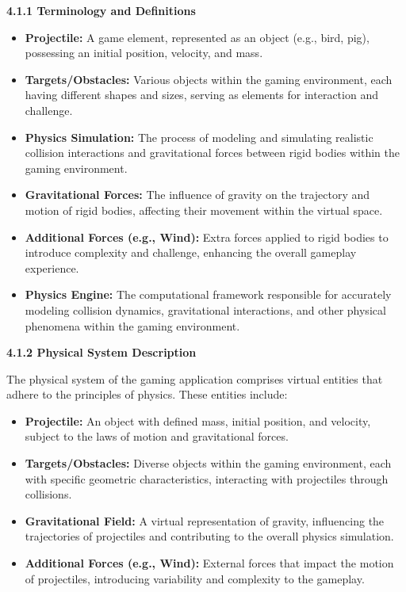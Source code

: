 \documentclass[
]{article}
\begin{document}
\textbf{4.1.1 Terminology and Definitions}

\begin{itemize}
\item
  \textbf{Projectile:} A game element, represented as an object (e.g.,
  bird, pig), possessing an initial position, velocity, and mass.
\item
  \textbf{Targets/Obstacles:} Various objects within the gaming
  environment, each having different shapes and sizes, serving as
  elements for interaction and challenge.
\item
  \textbf{Physics Simulation:} The process of modeling and simulating
  realistic collision interactions and gravitational forces between
  rigid bodies within the gaming environment.
\item
  \textbf{Gravitational Forces:} The influence of gravity on the
  trajectory and motion of rigid bodies, affecting their movement within
  the virtual space.
\item
  \textbf{Additional Forces (e.g., Wind):} Extra forces applied to rigid
  bodies to introduce complexity and challenge, enhancing the overall
  gameplay experience.
\item
  \textbf{Physics Engine:} The computational framework responsible for
  accurately modeling collision dynamics, gravitational interactions,
  and other physical phenomena within the gaming environment.
\end{itemize}

\textbf{4.1.2 Physical System Description}

The physical system of the gaming application comprises virtual entities
that adhere to the principles of physics. These entities include:

\begin{itemize}
\item
  \textbf{Projectile:} An object with defined mass, initial position,
  and velocity, subject to the laws of motion and gravitational forces.
\item
  \textbf{Targets/Obstacles:} Diverse objects within the gaming
  environment, each with specific geometric characteristics, interacting
  with projectiles through collisions.
\item
  \textbf{Gravitational Field:} A virtual representation of gravity,
  influencing the trajectories of projectiles and contributing to the
  overall physics simulation.
\item
  \textbf{Additional Forces (e.g., Wind):} External forces that impact
  the motion of projectiles, introducing variability and complexity to
  the gameplay.
\end{itemize}
\end{document}
